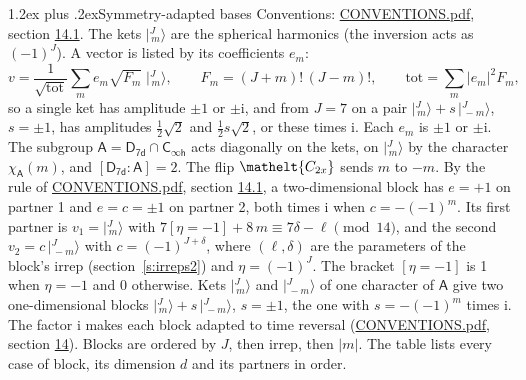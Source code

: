 \documentclass[10pt,a4paper]{article}
\makeatletter
\renewcommand\section{\@startsection{section}{1}{\z@}{-3ex plus -1ex minus -.2ex}%
  {1.2ex plus .2ex}{\normalfont\large\sffamily\bfseries\color{parttitle}}}
\numberwithin{equation}{section}
\newcommand{\eltfont}[1]{{\let\sigma\eltsigma\mathelt{#1}}}
\newcommand{\grp}[1]{\mathsf{#1}}
\newcommand{\elt}[1]{\eltfont{#1}}
\newcommand{\grpindex}[2]{[#1 : #2]}
\newcommand{\iverson}[1]{[#1]}
\newcommand{\iunit}{\mathrm{i}}
\newcommand{\chiA}{\chi_{\grp{A}}}
\newcommand{\jm}[2]{\bigl\lvert{}^{#1}_{\,#2}\bigr\rangle}
\makeatother
\begin{document}
\section{Symmetry-adapted bases}\label{s:bases}
Conventions: \href{../../CONVENTIONS.pdf}{CONVENTIONS.pdf}, section \href{../../CONVENTIONS.pdf\#conv.14.1}{14.1}.
\leavevmode\label{n:index.m}\label{n:vector.ket}The kets $\jm{J}{m}$ are the spherical harmonics (the inversion acts as $(-1)^J$). \label{n:index.ketcoefficient}\label{n:vector.basis.symmetry}\label{n:index.ketweight}\label{n:index.total}A vector is listed by its coefficients $e_m$:
\begin{equation}\label{e:ket}v = \frac{1}{\sqrt{\mathrm{tot}}}\sum_m e_m\sqrt{F_m}\;\jm{J}{m},\qquad F_m = (J+m)!\,(J-m)!,\qquad \mathrm{tot} = \sum_m |e_m|^2F_m,\end{equation}
\leavevmode\label{n:index.pair.sign}so a single ket has amplitude $\pm1$ or $\pm\iunit$, and from $J = 7$ on a pair $\jm{J}{m} + s\,\jm{J}{-m}$, $s = \pm1$, has amplitudes $\tfrac{1}{2}\sqrt{2}$ and $\tfrac{1}{2}s\sqrt{2}$, or these times $\iunit$. Each $e_m$ is $\pm1$ or $\pm\iunit$.
\leavevmode\label{n:group.A}\label{n:function.character.abelian}The subgroup $\grp{A} = \grp{D_{7d}}\cap\grp{C_{\infty h}}$ acts diagonally on the kets, on $\jm{J}{m}$ by the character $\chiA(m)$, and $\grpindex{\grp{D_{7d}}}{\grp{A}} = 2$. The flip $\elt{C_{2x}}$ sends $m$ to $-m$. \label{n:index.partner.sign}By the rule of \href{../../CONVENTIONS.pdf}{CONVENTIONS.pdf}, section \href{../../CONVENTIONS.pdf\#conv.14.1}{14.1}, a two-dimensional block has $e = +1$ on partner 1 and $e = c = \pm1$ on partner 2, both times $\iunit$ when $c = -(-1)^m$. \label{n:index.eta}Its first partner is $v_1 = \jm{J}{m}$ with $7\iverson{\eta = -1} + 8\,m \equiv 7\delta - \ell \pmod{14}$, and the second $v_2 = c\,\jm{J}{-m}$ with $c = (-1)^{J+\delta}$, where $(\ell, \delta)$ are the parameters of the block's irrep (section~\ref{s:irreps2}) and $\eta = (-1)^J$. The bracket $\iverson{\eta = -1}$ is 1 when $\eta = -1$ and 0 otherwise. Kets $\jm{J}{m}$ and $\jm{J}{-m}$ of one character of $\grp{A}$ give two one-dimensional blocks $\jm{J}{m} + s\,\jm{J}{-m}$, $s = \pm1$, the one with $s = -(-1)^m$ times $\iunit$. The factor $\iunit$ makes each block adapted to time reversal (\href{../../CONVENTIONS.pdf}{CONVENTIONS.pdf}, section \href{../../CONVENTIONS.pdf\#conv.14}{14}). Blocks are ordered by $J$, then irrep, then $|m|$.
\leavevmode\label{n:head.case}\label{n:head.partners}The table lists every case of block, its dimension $d$ and its partners in order.
\end{document}
